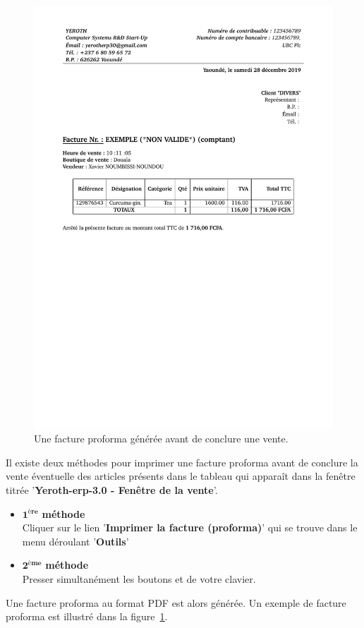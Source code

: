 \begin{figure}[!htbp]
	\centering
	\includegraphics[scale=0.75]{images/yeren-exemple-facture-grand-2017-06-13.pdf}
	\caption{Une facture proforma g\'en\'er\'ee avant de conclure une vente.}
	\label{fig:yeren-vendre-facture-proforma}
\end{figure}

Il existe deux m\'ethodes pour imprimer une facture
proforma avant de conclure la vente \'eventuelle des articles
pr\'esents dans le tableau qui appara\^it dans la fen\^etre
titr\'ee '\textbf{Yeroth-erp-3.0 - Fen\^etre de la vente}'.

\begin{itemize}[]
	\item \textcolor{purplish}{$\mathbf{1^{\text{\`ere}}}$ \textbf{m\'ethode}}\\
		Cliquer sur le lien '\textbf{Imprimer la facture (proforma)}'
		qui se trouve dans le menu d\'eroulant '\textbf{Outils}'\\

	\item \textcolor{purplish}{$\mathbf{2^{\text{\`eme}}}$ \textbf{m\'ethode}}\\
		Presser simultan\'ement les boutons 
		et  de votre clavier.
\end{itemize}

Une facture proforma au format PDF est alors g\'en\'er\'ee. Un
exemple de facture proforma est illustr\'e dans la
figure~\ref{fig:yeren-vendre-facture-proforma}.
